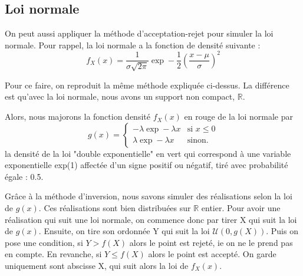 \documentclass[10pt]{article} %
\begin{document}
\subsection{Loi normale}

On peut aussi appliquer la méthode d'acceptation-rejet pour simuler la loi normale. Pour rappel, la loi normale a la fonction de densité suivante :
$$f_X(x) = \frac{1}{\sigma \sqrt{2\pi}}\exp-\frac{1}{2}(\frac {x-\mu}{\sigma})^2$$

Pour ce faire, on reproduit la même méthode expliquée ci-dessus. La différence est qu'avec la loi normale, nous avons un support non compact, $  \mathbb{R} $.

Alors, nous majorons la fonction densité $f_X(x)$ en rouge de la loi normale par
$$g(x) = \left\{
    \begin{array}{ll}
        -\lambda\exp-\lambda x & \mbox{si } x \le 0 \\
        \lambda\exp-\lambda x & \mbox{sinon.}
    \end{array}
\right. $$
la densité de la loi "double exponentielle" en vert qui correspond à une variable exponentielle exp(1) affectée d'un signe positif ou négatif, tiré avec probabilité égale : 0.5.


Grâce à la méthode d'inversion, nous savons simuler des réalisations selon la loi de $g(x)$. Ces réalisations sont bien distribuées sur $  \mathbb{R} $ entier. Pour avoir une réalisation qui suit une loi normale, on commence donc par tirer X qui suit la loi de $g(x)$. Ensuite, on tire son ordonnée Y qui suit la loi $\mathcal{U}(0, g(X))$. Puis on pose une condition, si $Y > f(X)$ alors le point est rejeté, ie on ne le prend pas en compte. En revanche, si $Y \le f(X)$ alors le point est accepté. On garde uniquement sont abscisse X, qui suit alors la loi de $f_X(x)$.

\newpage
\end{document}
